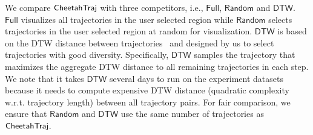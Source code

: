  We compare $\mathsf{CheetahTraj}$ with three competitors, i.e., $\mathsf{Full}$, $\mathsf{Random}$ and $\mathsf{DTW}$. $\mathsf{Full}$ visualizes all trajectories in the user selected region while $\mathsf{Random}$ selects trajectories in the user selected region at random for visualization. $\mathsf{DTW}$ is based on the DTW distance between trajectories~\cite{borcan2012improving} and designed by us to select trajectories with good diversity. Specifically, $\mathsf{DTW}$ samples the trajectory that maximizes the aggregate DTW distance to all remaining trajectories in each step. We note that it takes $\mathsf{DTW}$ several days to run on the experiment datasets because it needs to compute expensive DTW distance (quadratic complexity w.r.t. trajectory length) between all trajectory pairs. For fair comparison, we ensure that $\mathsf{Random}$ and $\mathsf{DTW}$ use the same number of trajectories as $\mathsf{CheetahTraj}$.




